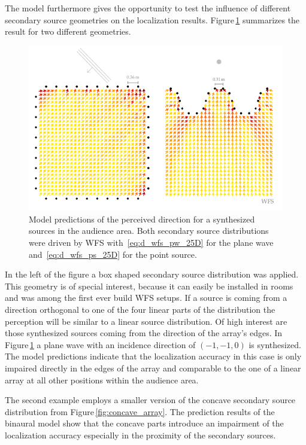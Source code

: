 The model furthermore gives the opportunity to test the influence of different
secondary source geometries on the localization results.
Figure\,\ref{fig:wfs_model} summarizes the result for two different geometries.
%
\begin{figure}
    \centering
    \includegraphics{fig6_06/fig6_06}
    \caption{Model predictions of the perceived direction for a synthesized
    sources in the audience area. Both secondary source
    distributions were driven by \ac{WFS} with~\protect\eqref{eq:d_wfs_pw_25D} for the
    plane wave and~\protect\eqref{eq:d_wfs_ps_25D} for the point source.
    }
    \label{fig:wfs_model}
\end{figure}
%
In the left of the figure a box shaped secondary source distribution was applied.
This geometry is of special interest, because it can easily be installed in
rooms and was among the first ever build \ac{WFS}
setups.
If a source is coming from a direction orthogonal to one of the four linear
parts of the distribution the perception will be similar to a linear source
distribution. Of high interest are those synthesized sources coming from the direction
of the array's edges. In Figure\,\ref{fig:wfs_model} a plane wave with an
incidence direction of $(-1,-1,0)$ is synthesized. The model predictions
indicate
that the localization accuracy in this case is only impaired directly in the
edges of the array and comparable to the one of a linear array at all other
positions within the audience area.

The second example employs a smaller version of the concave secondary source
distribution from Figure\,\ref{fig:concave_array}.
The prediction results of the binaural model show that the
concave parts introduce an impairment of the localization
accuracy especially in the proximity of the secondary sources. 

